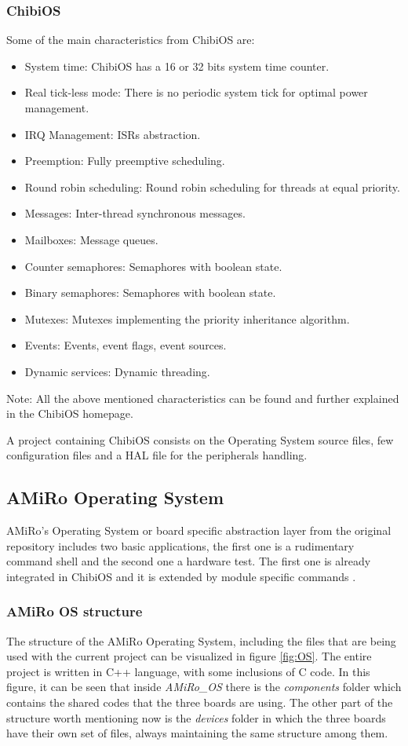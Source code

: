 \documentclass[12pt]{report}%
\begin{document}
\subsubsection{ChibiOS}
Some of the main characteristics from ChibiOS are:

\begin{itemize}
\item System time: ChibiOS has a 16 or 32 bits system time counter.
\item Real tick-less mode: There is no periodic system tick for optimal power management.
\item IRQ Management: ISRs abstraction.
\item Preemption: Fully preemptive scheduling.
\item Round robin scheduling: Round robin scheduling for threads at equal priority.
\item Messages: Inter-thread synchronous messages.
\item Mailboxes: Message queues.
\item Counter semaphores: Semaphores with boolean state.
\item Binary semaphores: Semaphores with boolean state.
\item Mutexes: Mutexes implementing the priority inheritance algorithm.
\item Events: Events, event flags, event sources.
\item Dynamic services: Dynamic threading.
\end{itemize}
Note: All the above mentioned characteristics can be found and further explained in the ChibiOS homepage. \cite{chibioshp}

A project containing ChibiOS consists on the Operating System source files, few configuration files and a HAL file for the peripherals handling.

\subsection{AMiRo Operating System}
\label{AMiRo_OS}
AMiRo's Operating System or board specific abstraction layer from the original repository \cite{AMiRo_Wiki} includes two basic applications, the first one is a rudimentary command shell and the second one a hardware test. The first one is already integrated in ChibiOS and it is extended by module specific commands \cite{AMiRo_paper_modular}.

\subsubsection{AMiRo OS structure}
The structure of the AMiRo Operating System, including the files that are being used with the current project can be visualized in figure \ref{fig:OS}. The entire project is written in C++ language, with some inclusions of C code. In this figure, it can be seen that inside \textit{AMiRo\_OS} there is the \textit{components} folder which contains the shared codes that the three boards are using. The other part of the structure worth mentioning now is the \textit{devices} folder in which the three boards have their own set of files, always maintaining the same structure among them.
\end{document}
